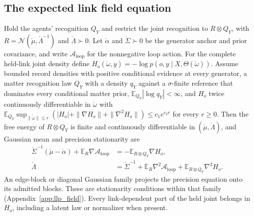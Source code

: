 \subsection{The expected link field equation}
\label{sec:latent_link_field}
Hold the agents' recognition $Q_Y$ and restrict the joint recognition to $R\otimes Q_Y$,
with $R=\mathcal N(\mathring\mu,\mathring\Lambda^{-1})$ and $\mathring\Lambda\succ0$.
Let $\mathring\alpha$ and $\mathring\Sigma\succ0$ be the generator anchor and prior
covariance, and write $\mathcal A_{\mathrm{loop}}$ for the nonnegative loop action.
For the complete held-link joint density define
$H_o(\mathring\omega,y)=-\log p(o,y\mid X,\Theta(\mathring\omega))$.
Assume bounded record densities with positive conditional evidence at every generator,
a matter recognition law $Q_Y$ with a density $q_Y$ against a $\sigma$-finite reference
that dominates every conditional matter prior, $\mathbb E_{Q_Y}|\log q_Y|<\infty$, and
$H_o$ twice continuously differentiable in $\mathring\omega$ with
$\mathbb E_{Q_Y}\sup_{\|\mathring\omega\|\leq r}(|H_o|+\|\nabla H_o\|+\|\nabla^2H_o\|)\leq c_1e^{c_2r}$
for every $r\geq0$. Then the free energy of $R\otimes Q_Y$ is finite and continuously
differentiable in $(\mathring\mu,\mathring\Lambda)$, and Gaussian mean and precision
stationarity are
\begin{equation}
\boxed{\begin{aligned}
\mathring\Sigma^{-1}(\mathring\mu-\mathring\alpha)
+\mathbb E_R\nabla\mathcal A_{\mathrm{loop}}
&=-\mathbb E_{R\otimes Q_Y}\nabla H_o,\\
\mathring\Lambda
&=\mathring\Sigma^{-1}+\mathbb E_R\nabla^2\mathcal A_{\mathrm{loop}}
+\mathbb E_{R\otimes Q_Y}\nabla^2 H_o.
\end{aligned}}
\label{eq:latent_link_stationarity}
\end{equation}
An edge-block or diagonal Gaussian family projects the precision equation onto its
admitted blocks. These are stationarity conditions within that family
(Appendix~\ref{app:llp_field}). Every
link-dependent part of the held joint belongs in $H_o$, including a latent law or
normalizer when present.

